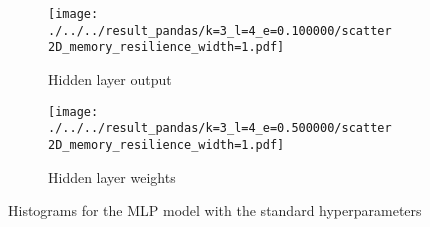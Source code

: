 \documentclass[../main.tex]{subfiles}
\begin{document}
\begin{figure}[H]
    \centering
    \begin{subfigure}[b]{0.4\textwidth}
        \texttt{[image: ./../../result\_pandas/k=3\_l=4\_e=0.100000/scatter2D\_memory\_resilience\_width=1.pdf]}
        \caption{Hidden layer output}
    \end{subfigure}
    \begin{subfigure}[b]{0.4\textwidth}
        \texttt{[image: ./../../result\_pandas/k=3\_l=4\_e=0.500000/scatter2D\_memory\_resilience\_width=1.pdf]}
        \caption{Hidden layer weights}
    \end{subfigure}
    \caption{Histograms for the MLP model with the standard hyperparameters}
    \label{fig:regular_hid}
\end{figure}
\end{document}
